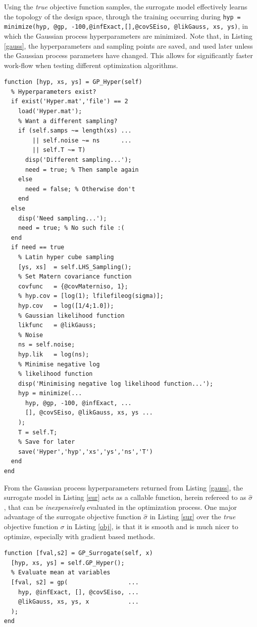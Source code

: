 \documentclass{article}
\begin{document}
Using the \textit{true} objective function samples, the surrogate model effectively learns the topology of the design space, through the training occurring during \lstinline{hyp = minimize(hyp, @gp, -100,@infExact,[],@covSEiso, @likGauss, xs, ys)}, in which the Gaussian process hyperparameters are minimized. Note that, in Listing \ref{gauss}, the hyperparameters and sampling points are saved, and used later unless the Gaussian process parameters have changed. This allows for significantly faster work-flow when testing different optimization algorithms.

\begin{lstlisting}[caption=Gaussian Process Hyperparameters, label=gauss]
function [hyp, xs, ys] = GP_Hyper(self)
  % Hyperparameters exist?
  if exist('Hyper.mat','file') == 2
    load('Hyper.mat');
    % Want a different sampling?
    if (self.samps ~= length(xs) ...
        || self.noise ~= ns      ...
        || self.T ~= T)
      disp('Different sampling...');
      need = true; % Then sample again
    else
      need = false; % Otherwise don't
    end
  else
    disp('Need sampling...');
    need = true; % No such file :(
  end
  if need == true
    % Latin hyper cube sampling
    [ys, xs]  = self.LHS_Sampling();
    % Set Matern covariance function
    covfunc   = {@covMaterniso, 1};
    % hyp.cov = [log(1); lfilefileog(sigma)];
    hyp.cov   = log([1/4;1.0]);
    % Gaussian likelihood function
    likfunc   = @likGauss;
    % Noise
    ns = self.noise;
    hyp.lik   = log(ns);
    % Minimise negative log
    % likelihood function
    disp('Minimising negative log likelihood function...');
    hyp = minimize(...
      hyp, @gp, -100, @infExact, ...
      [], @covSEiso, @likGauss, xs, ys ...
    );
    T = self.T;
    % Save for later
    save('Hyper','hyp','xs','ys','ns','T')
  end
end
\end{lstlisting}

From the Gaussian process hyperparameters returned from Listing \ref{gauss}, the surrogate model in Listing \ref{sur} acts as a callable function, herein refereed to as $\hat{\sigma}$, that can be \textit{inexpensively} evaluated in the optimization process. One major advantage of the surrogate objective function $\hat{\sigma}$ in Listing \ref{sur} over the \textit{true} objective function $\sigma$ in Listing \ref{obj}, is that it is smooth and is much nicer to optimize, especially with gradient based methods.

\begin{lstlisting}[caption=Surrogate Objective Function, label=sur]
function [fval,s2] = GP_Surrogate(self, x)
  [hyp, xs, ys] = self.GP_Hyper();
  % Evaluate mean at variables
  [fval, s2] = gp(                 ...
    hyp, @infExact, [], @covSEiso, ...
    @likGauss, xs, ys, x           ...
  );
end
\end{lstlisting}
\end{document}
